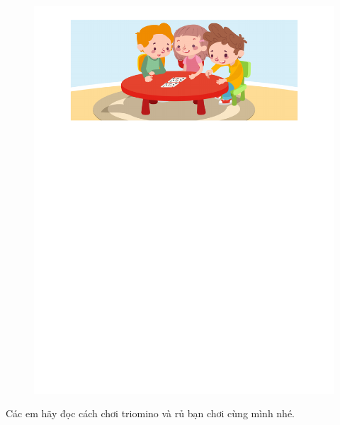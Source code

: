 	\begin{figure}[H]
	\centering
	\vspace*{-5pt}
	\captionsetup{labelformat=empty, justification=centering}
	\includegraphics[width=1\textwidth]{h11}
	\vspace*{-20pt}
	\end{figure}
	Các em hãy đọc cách chơi triomino và rủ bạn chơi cùng mình nhé. 